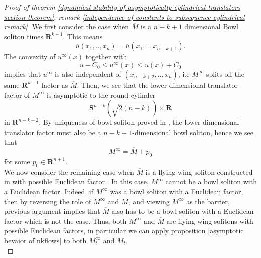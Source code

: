 \documentclass[pdflatex,sn-mathphys-num]{sn-jnl}%
\begin{document}
\begin{proof}[Proof of theorem \ref{dynamical stability of asymptotically cylindrical translators section theorem}, remark \ref{independence of constants to subsequence cylindrical remark}]
We first consider the case when $  \overline{M}$ is a $n-k+1$ dimensional Bowl soliton times $\mathbf{R}^{k-1}$. This means 
\begin{equation}
    \overline{u}(x_1,..,x_n) = \overline{u}(x_1,..,x_{n-k+1}).
\end{equation}
The convexity of $u^{\infty}(x)$ together with
\begin{equation}
    \overline{u} - C_0 \leq u^{\infty}(x) \leq \overline{u}(x) + C_0
\end{equation}
implies that $u^{\infty}$ is also independent of $(x_{n-k+2},..,x_n)$, i.e $M^{\infty}$ splits off the same $\mathbf{R}^{k-1}$ factor as $\overline{M}$. Then, we see that the lower dimensional translator factor of $M^{\infty}$ is asymptotic to the round cylinder 
\begin{equation}
    \mathbf{S}^{n-k}(\sqrt{2(n-k)})\times \mathbf{R} 
\end{equation}
in $\mathbf{R}^{n-k+2}$. By uniqueness of bowl soliton proved in \cite{Haslhofer2014UniquenessOT}, the lower dimensional translator factor must also be a $n-k+1$-dimensional bowl soliton, hence we see that 
\begin{equation}
    M^{\infty} = \overline{M} + p_0
\end{equation}
for some $p_0 \in \mathbf{R}^{n+1}$.\\

We now consider the remaining case when $\overline{M}$ is a flying wing soliton constructed in \cite{Hoffman2018GraphicalTF} with possible Euclidean factor . In this case, $M^{\infty}$ cannot be a bowl soliton with a Euclidean factor. Indeed, if $M^{\infty}$ was a bowl soliton with a Euclidean factor, then by reversing the role of $M^{\infty}$ and $\overline{M}$, and viewing $M^{\infty}$ as the barrier, previous argument implies that $\overline{M}$ also has to be a bowl soliton with a Euclidean factor which is not the case. Thus, both $M^{\infty}$ and $\overline{M}$ are flying wing solitons with possible Euclidean factors, in particular we can apply proposition \ref{asymptotic bevaior of nkflows} to both $M^{\infty}_t$ and $\overline{M}_t$.\\


\end{proof}
\end{document}
